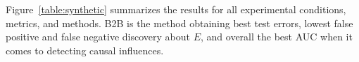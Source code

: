 %
%
%

Figure~\ref{table:synthetic} summarizes the results for all experimental
conditions, metrics, and methods.
%
B2B is the method obtaining best test errors, lowest false positive and false
negative discovery about $E$, and overall the best AUC when it comes to
detecting causal influences.
